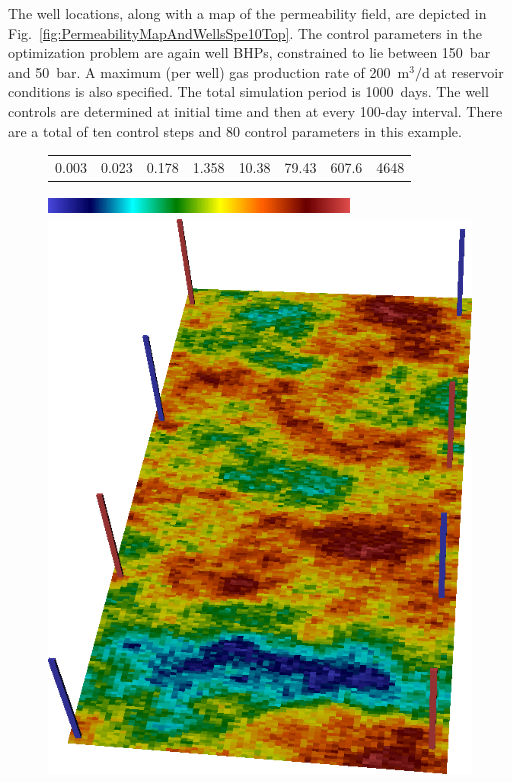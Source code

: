 The well locations, along with a map of the permeability field, are depicted in
Fig.~\ref{fig:PermeabilityMapAndWellsSpe10Top}. The control parameters in the
optimization problem are again well BHPs, constrained to lie between 150~bar and 50~bar. A
maximum (per well) gas production rate of 200~m$^3/$d at reservoir conditions is also specified.
The total simulation period is 1000~days. The well controls are determined
at initial time and then at every 100-day interval. There are a
total of ten control steps and 80 control parameters in this example.


%
\begin{figure}[ht]
\begin{center}
     \begin{tabular}{cccccccc}
      0.003 &  0.023 & 0.178 & 1.358 & 10.38 & 79.43 & 607.6 &4648
      \end{tabular}
      \includegraphics[width=8cm, height=0.5cm]{figures/VanEssenModelPermeabilityMapColorBar.png}
       
       \medskip

       \includegraphics[totalheight=3.2in]{figures/SPE10TopModelPermeabilityMapConstantRotated.png} %


\end{center}
\end{figure}
